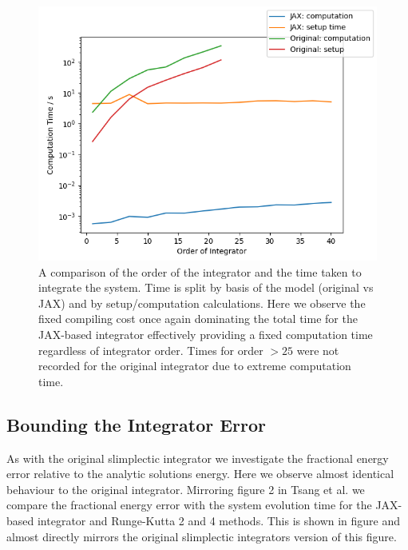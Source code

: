 \documentclass[10pt]{iopart}
\begin{document}
\begin{figure}
	\label{rplot}
	\includegraphics[width=\columnwidth]{RPlot.jpg}
	\caption{A comparison of the order of the integrator and the time taken to integrate the system. Time is split by basis of the model (original vs JAX) and by setup/computation calculations. Here we observe the fixed compiling cost once again dominating the total time for the JAX-based integrator effectively providing a fixed computation time regardless of integrator order. Times for order $>25$ were not recorded for the original integrator due to extreme computation time.}
\end{figure}

\subsection{Bounding the Integrator Error}
As with the original slimplectic integrator we investigate the fractional energy error relative to the analytic solutions energy. Here we observe almost identical behaviour to the original integrator. Mirroring figure 2 in Tsang et al. \cite{Tsang_Slimplectic} we compare the fractional energy error with the system evolution time for the JAX-based integrator and Runge-Kutta 2 and 4 methods. This is shown in figure \cite{EnergyPlot} and almost directly mirrors the original slimplectic integrators version of this figure. 
\end{document}
